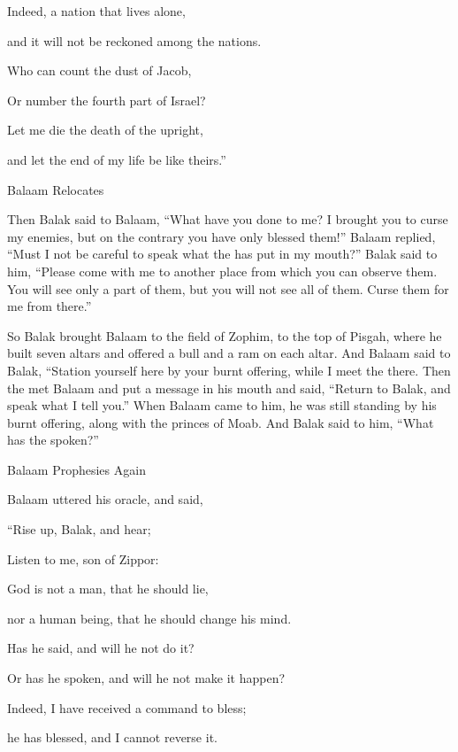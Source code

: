 {\par }{\Q Indeed,
a nation
that lives alone,
\par }{\Q and it will not
be reckoned
among the nations.
\par }{\Q {}Who can
count
the dust
of Jacob,
\par }{\Q Or number
the
fourth part
of Israel?
\par }{\Q Let me die
the death
of the upright,
\par }{\Q and let the end
of my life
be
like theirs.”
\par }{\SH Balaam Relocates
\par }{\PP {}Then Balak
said
to Balaam,
“What
have you done
to me? I brought you to curse
my enemies,
but on the contrary
you have
only blessed them!”
Balaam
replied, “Must I not
be careful
to speak
what
the {}
has put
in my mouth?”
Balak
said
to him,
“Please come
with
me to
another
place
from which
you can
observe
them. You will see
only
a part
of them, but you will not
see
all
of them. Curse
them for me from there.”
\par }{\PP {}So
Balak brought
Balaam to
the field
of Zophim,
to
the top
of Pisgah,
where he built
seven
altars
and offered
a bull
and a ram
on each altar.
And Balaam said
to Balak,
“Station yourself
here by
your burnt offering,
while
I
meet
the
{} there.
Then the
{}
met
Balaam
and put
a message
in his mouth
and said,
“Return
to
Balak,
and speak what
I tell you.”
When Balaam came
to
him, he was still
standing
by his burnt offering,
along with
the princes
of Moab.
And Balak
said
to him, “What
has the
{}
spoken?”
\par }{\SH Balaam Prophesies Again
\par }{\PP {}Balaam uttered
his oracle,
and said,
\par }{\Q “Rise
up, Balak,
and hear;
\par }{\Q Listen
to
me, son
of Zippor:
\par }{\Q {}God
is not
a man,
that he should lie,
\par }{\Q nor a human
being, that he should change
his mind.
\par }{\Q Has he said,
and will he not
do
it?
\par }{\Q Or has he
spoken,
and will he not
make
it happen?
\par }{\Q {}Indeed,
I have received
a command to bless;
\par }{\Q he has blessed,
and I cannot
reverse it.
}
